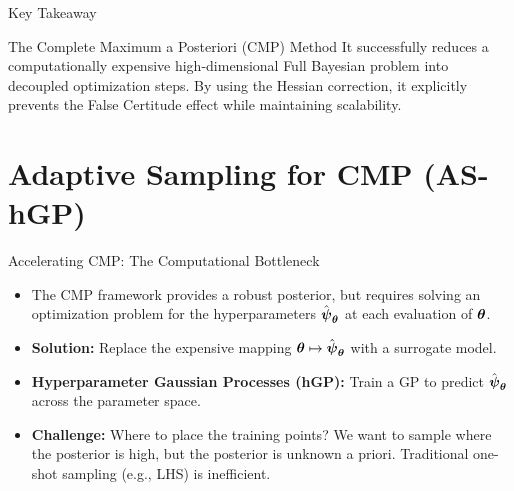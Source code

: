 \begin{frame}{Key Takeaway}
    \begin{block}{The Complete Maximum a Posteriori (CMP) Method}
        It successfully reduces a computationally expensive high-dimensional Full Bayesian problem into decoupled optimization steps. By using the Hessian correction, it explicitly prevents the False Certitude effect while maintaining scalability.
    \end{block}
\end{frame}

\section{Adaptive Sampling for CMP (AS-hGP)}

\begin{frame}{Accelerating CMP: The Computational Bottleneck}
    \begin{itemize}
        \item The CMP framework provides a robust posterior, but requires solving an optimization problem for the hyperparameters $\hat{\boldsymbol{\psi}}_{\boldsymbol{\theta}}$ at each evaluation of $\boldsymbol{\theta}$.
        \item \textbf{Solution:} Replace the expensive mapping $\boldsymbol{\theta} \mapsto \hat{\boldsymbol{\psi}}_{\boldsymbol{\theta}}$ with a surrogate model.
        \item \textbf{Hyperparameter Gaussian Processes (hGP):} Train a GP to predict $\hat{\boldsymbol{\psi}}_{\boldsymbol{\theta}}$ across the parameter space.
        \item \textbf{Challenge:} Where to place the training points? We want to sample where the posterior is high, but the posterior is unknown a priori. Traditional one-shot sampling (e.g., LHS) is inefficient.
    \end{itemize}
\end{frame}

